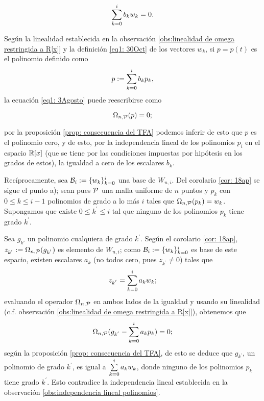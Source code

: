 \begin{equation} \label{eq1: 3Agosto}
\sum\limits_{k=0}^{i}b_{k}w_{k}=0.
\end{equation}

\noindent 
Según la linealidad establecida en la observación
\ref{obs:linealidad de omega restringida a R[x]}
y la definición \ref{eq1: 30Oct} de los vectores $w_{k}$,
si $p=p(t)$ es el polinomio
definido como
\begin{equation}
\label{eq2: 30Oct}
p:=\sum\limits_{k=0}^{i}b_{k}p_{k},
\end{equation}
la ecuación \eqref{eq1: 3Agosto} puede reescribirse como

\begin{equation} \label{eq2: 3Agosto}
\Omega_{n , \mathcal{P}} (p) = 0;
\end{equation}

\noindent
por la proposición \ref{prop: consecuencia del TFA}
podemos inferir de esto que $p$ es el polinomio cero,  
y de esto, por la
independencia lineal de los polinomios $p_{i}$
en el espacio $\mathbb{R}[x]$ (que se tiene por las condiciones
impuestas por hipótesis en los grados de estos), la
igualdad a cero de los escalares $b_{k}$. 

Recíprocamente, sea $\mathcal{B}_{i} := \{ w_{k} \}_{k=0}^{i}$
una base de $W_{n,i}$. Del corolario 
\ref{cor: 18ap} se sigue el punto a);
sean pues $\mathcal{P}$ una malla uniforme
de $n$ puntos
y $p_{k}$ con $0 \leq k \leq i-1$ polinomios de grado
a lo más $i$ tales que 
$\Omega_{n, \mathcal{P}}(p_{k})=w_{k}$.
Supongamos que existe $0 \leq k^{'} \leq i$
tal que ninguno de los polinomios $p_{k}$
tiene grado $k^{'}$.

Sea $g_{k'}$ un polinomio cualquiera de grado $k^{'}$.
Según el corolario \ref{cor: 18ap}, 
$z_{k^{'}}:= \Omega_{n, \mathcal{P}}(g_{k^{'}})$ es elemento
de $W_{n,i}$; como $\mathcal{B}_{i} := \{ w_{k} \}_{k=0}^{i}$
es base de este espacio, existen escalares
$a_{k}$ (no todos cero, pues
$z_{k^{'}} \neq 0$) tales que 
\[
z_{k^{'}} = \sum\limits_{k=0}^{i}a_{k} w_{k};
\]
evaluando el operador $\Omega_{n, \mathcal{P}}$ en ambos
lados de la igualdad y usando su linealidad
(c.f. observación \ref{obs:linealidad de omega restringida a R[x]}), 
obtenemos que 
\[
\Omega_{n, \mathcal{P}}(g_{k^{'}} - \sum\limits_{k=0}^{i}a_{k}p_{k}) = 0;
\]
según la proposición
\ref{prop: consecuencia del TFA}, de esto se deduce que 
$g_{k^{'}}$, un polinomio de grado $k^{'}$, es 
igual a $\sum\limits_{k=0}^{i}a_{k}w_{k}$, donde ninguno de los 
polinomios $p_{k}$ tiene grado $k^{'}$.
Esto contradice la independencia lineal 
establecida en la observación 
\ref{obs:independencia lineal polinomios}.
\QEDB
\vspace{0.2cm}


